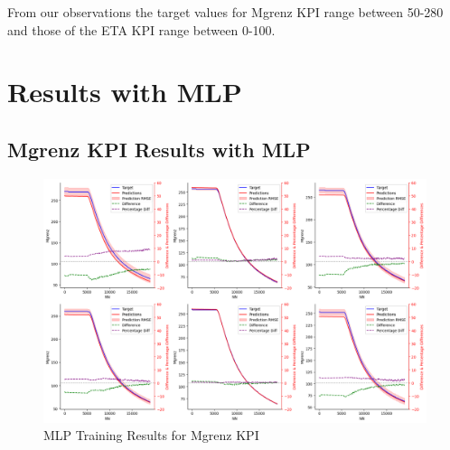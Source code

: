\documentclass{report} %
\begin{document}
From our observations the target values for Mgrenz \ac{KPI} range between 50-280 and those of the ETA \ac{KPI} range between 0-100.

\section{Results with \ac{MLP}}\label{sec:Results with MLP}

\subsection{Mgrenz \ac{KPI} Results with \ac{MLP}}\label{sec:2D Torque Curve Results with MLP}

\begin{figure}[H]
    \centering
    \includegraphics[width=1\textwidth]{./ReportImages/KPI2D_predictions.png} 
    \caption{MLP Training Results for Mgrenz \ac{KPI}} 
    \label{fig:MLP Training Results for 2D KPI(Mgrenz)}
\end{figure}
\end{document}
